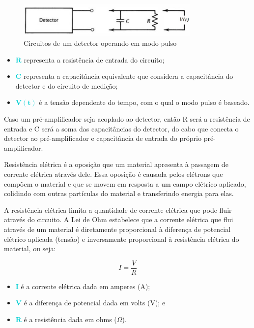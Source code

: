 \documentclass[11pt,a4paper]{article}
\newcounter{exemplo}
\begin{document}
				\begin{figure}[h]
					\centering
					\includegraphics[width=0.8\textwidth]{Imagens/esquemaModoPulso.jpg}
					\caption{Circuitos de um detector operando em modo pulso}
					\label{fig:esquemaModoPulso}
				\end{figure}

				\begin{exemplo}[onde,]
					\begin{itemize}
						\item \textcolor{DarkTurquoise}{$\mathbf{R}$} representa a resistência de entrada do circuito;
						\item \textcolor{DarkTurquoise}{$\mathbf{C}$} representa a capacitância equivalente que considera a capacitância do detector e do circuito de medição; 
						\item \textcolor{DarkTurquoise}{$\mathbf{V(t)}$} é a tensão dependente do tempo, com o qual o modo pulso é baseado.
					\end{itemize}
				\end{exemplo}

			Caso um pré-amplificador seja acoplado ao detector, então R será a resistência de entrada e C será a soma das capacitâncias do detector, do cabo que conecta o detector ao pré-amplificador e capacitância de entrada do próprio pré-amplificador.

			Resistência elétrica é a oposição que um material apresenta à passagem de corrente elétrica através dele. Essa oposição é causada pelos elétrons que compõem o material e que se movem em resposta a um campo elétrico aplicado, colidindo com outras partículas do material e transferindo energia para elas. 

			A resistência elétrica limita a quantidade de corrente elétrica que pode fluir através do circuito. A Lei de Ohm estabelece que a corrente elétrica que flui através de um material é diretamente proporcional à diferença de potencial elétrico aplicada (tensão) e inversamente proporcional à resistência elétrica do material, ou seja:

				\begin{equation}
					I = \frac{V}{R}
				\end{equation}

				\begin{exemplo}[onde,]
					\begin{itemize}
						\item \textcolor{DarkTurquoise}{$\mathbf{I}$} é a corrente elétrica dada em amperes (A);
						\item \textcolor{DarkTurquoise}{$\mathbf{V}$} é a diferença de potencial dada em volts (V); e
						\item \textcolor{DarkTurquoise}{$\mathbf{R}$}  é a resistência dada em ohms ($\Omega$).
					\end{itemize}
				\end{exemplo}
\end{document}
